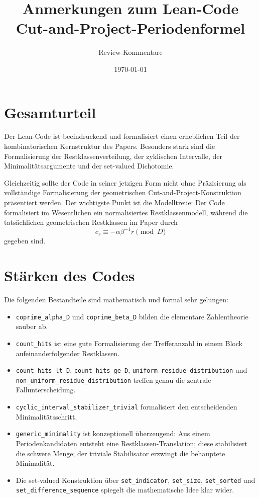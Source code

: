 \documentclass[11pt]{article}
\title{Anmerkungen zum Lean-Code\\
\large Cut-and-Project-Periodenformel}
\author{Review-Kommentare}
\date{\today}
\begin{document}
\maketitle

\section*{Gesamturteil}

Der Lean-Code ist beeindruckend und formalisiert einen erheblichen Teil der kombinatorischen Kernstruktur des Papers. Besonders stark sind die Formalisierung der Restklassenverteilung, der zyklischen Intervalle, der Minimalitätsargumente und der set-valued Dichotomie.

Gleichzeitig sollte der Code in seiner jetzigen Form nicht ohne Präzisierung als vollständige Formalisierung der geometrischen Cut-and-Project-Konstruktion präsentiert werden. Der wichtigste Punkt ist die Modelltreue: Der Code formalisiert im Wesentlichen ein normalisiertes Restklassenmodell, während die tatsächlichen geometrischen Restklassen im Paper durch
\[
    c_r \equiv -\alpha\beta^{-1}r \pmod D
\]
gegeben sind.

\section{Stärken des Codes}

Die folgenden Bestandteile sind mathematisch und formal sehr gelungen:

\begin{itemize}[leftmargin=2em]
    \item \texttt{coprime\_alpha\_D} und \texttt{coprime\_beta\_D} bilden die elementare Zahlentheorie sauber ab.
    \item \texttt{count\_hits} ist eine gute Formalisierung der Trefferanzahl in einem Block aufeinanderfolgender Restklassen.
    \item \texttt{count\_hits\_lt\_D}, \texttt{count\_hits\_ge\_D}, \texttt{uniform\_residue\_distribution} und \texttt{non\_uniform\_residue\_distribution} treffen genau die zentrale Fallunterscheidung.
    \item \texttt{cyclic\_interval\_stabilizer\_trivial} formalisiert den entscheidenden Minimalitätsschritt.
    \item \texttt{generic\_minimality} ist konzeptionell überzeugend: Aus einem Periodenkandidaten entsteht eine Restklassen-Translation; diese stabilisiert die schwere Menge; der triviale Stabilisator erzwingt die behauptete Minimalität.
    \item Die set-valued Konstruktion über \texttt{set\_indicator}, \texttt{set\_size}, \texttt{set\_sorted} und \texttt{set\_difference\_sequence} spiegelt die mathematische Idee klar wider.
\end{itemize}
\end{document}
